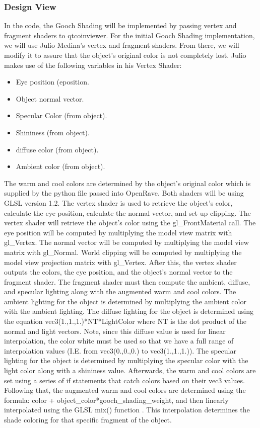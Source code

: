 \documentclass[10pt,journal,compsoc,draftclsnofoot]{IEEEtran}
\begin{document}
\begin{flushleft}
\subsubsection{Design View}
In the code, the Gooch Shading will be implemented by passing vertex and fragment shaders to qtcoinviewer.
For the initial Gooch Shading implementation, we will use Julio Medina's vertex and fragment shaders.
From there, we will modify it to assure that the object's original color is not completely lost. 
Julio makes use of the following variables in his Vertex Shader:
\begin{itemize}
\item Eye position (eposition.
\item Object normal vector.
\item Specular Color (from object).
\item Shininess (from object).
\item diffuse color (from object).
\item Ambient color (from object).
\end{itemize}

The warm and cool colors are determined by the object's original color which is supplied by the python file passed into OpenRave.
Both shaders will be using GLSL version 1.2.
The vertex shader is used to retrieve the object's color, calculate the eye position, calculate the normal vector, and set up clipping.
The vertex shader will retrieve the object's color using the gl\_FrontMaterial call.
The eye position will be computed by multiplying the model view matrix with gl\_Vertex.
The normal vector will be computed by multiplying the model view matrix with gl\_Normal.
World clipping will be computed by multiplying the model view projection matrix with gl\_Vertex.
After this, the vertex shader outputs the colors, the eye position, and the object's normal vector to the fragment shader.
The fragment shader must then compute the ambient, diffuse, and specular lighting along with the augmented warm and cool colors.
The ambient lighting for the object is determined by multiplying the ambient color with the ambient lighting.
The diffuse lighting for the object is determined using the equation vec3(1.,1.,1.)*NT*LightColor where NT is the dot product of the normal and light vectors.
Note, since this diffuse value is used for linear interpolation, the color white must be used so that we have a full range of interpolation values (I.E. from vec3(0.,0.,0.) to vec3(1.,1.,1.)). 
The specular lighting for the object is determined by multiplying the specular color with the light color along with a shininess value.
Afterwards, the warm and cool colors are set using a series of if statements that catch colors based on their vec3 values.
Following that, the augmented warm and cool colors are determined using the formula: color + object\_color*gooch\_shading\_weight, and then linearly interpolated using the GLSL mix() function \cite{glslmix}.
This interpolation determines the shade coloring for that specific fragment of the object.


\end{flushleft}
\end{document}
